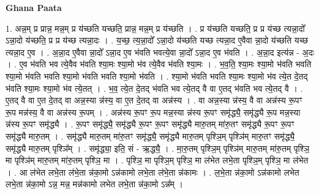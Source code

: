 \documentclass[17pt]{extarticle}
\begin{document}
\textbf{Ghana Paata } \newline

1. अन्न॒म् प्र प्रान्न॒ मन्न॒म् प्र य॑च्छति यच्छति॒ प्रान्न॒ मन्न॒म् प्र य॑च्छति । . प्र य॑च्छति यच्छति॒ प्र प्र य॑च्छ त्यन्ना॒दो᳚ ऽन्ना॒दो य॑च्छति॒ प्र प्र य॑च्छ त्यन्ना॒दः । . य॒च्छ॒ त्य॒न्ना॒दो᳚ ऽन्ना॒दो य॑च्छति यच्छ त्यन्ना॒द ए॒वैवा न्ना॒दो य॑च्छति यच्छ त्यन्ना॒द ए॒व । . अ॒न्ना॒द ए॒वैवा न्ना॒दो᳚ ऽन्ना॒द ए॒व भ॑वति भवत्ये॒वा न्ना॒दो᳚ ऽन्ना॒द ए॒व भ॑वति । . अ॒न्ना॒द इत्य॑न्न - अ॒दः । . ए॒व भ॑वति भव त्ये॒वैव भ॑वति श्या॒मः श्या॒मो भ॑व त्ये॒वैव भ॑वति श्या॒मः । . भ॒व॒ति॒ श्या॒मः श्या॒मो भ॑वति भवति श्या॒मो भ॑वति भवति श्या॒मो भ॑वति भवति श्या॒मो भ॑वति । . श्या॒मो भ॑वति भवति श्या॒मः श्या॒मो भ॑व त्ये॒त दे॒तद् भ॑वति श्या॒मः श्या॒मो भ॑व त्ये॒तत् । . भ॒व॒ त्ये॒त दे॒तद् भ॑वति भव त्ये॒तद् वै वा ए॒तद् भ॑वति भव त्ये॒तद् वै । . ए॒तद् वै वा ए॒त दे॒तद् वा अन्न॒स्या न्न॑स्य॒ वा ए॒त दे॒तद् वा अन्न॑स्य । . वा अन्न॒स्या न्न॑स्य॒ वै वा अन्न॑स्य रू॒पꣳ रू॒प मन्न॑स्य॒ वै वा अन्न॑स्य रू॒पम् । . अन्न॑स्य रू॒पꣳ रू॒प मन्न॒स्या न्न॑स्य रू॒पꣳ समृ॑द्ध्यै॒ समृ॑द्ध्यै रू॒प मन्न॒स्या न्न॑स्य रू॒पꣳ समृ॑द्ध्यै । . रू॒पꣳ समृ॑द्ध्यै॒ समृ॑द्ध्यै रू॒पꣳ रू॒पꣳ समृ॑द्ध्यै मारु॒तम् मा॑रु॒तꣳ समृ॑द्ध्यै रू॒पꣳ रू॒पꣳ समृ॑द्ध्यै मारु॒तम् । . समृ॑द्ध्यै मारु॒तम् मा॑रु॒तꣳ समृ॑द्ध्यै॒ समृ॑द्ध्यै मारु॒तम् पृश्ञि॒म् पृश्ञि॑म् मारु॒तꣳ समृ॑द्ध्यै॒ समृ॑द्ध्यै मारु॒तम् पृश्ञि᳚म् । . समृ॑द्ध्या॒ इति॒ सं - ऋ॒द्ध्यै॒ । . मा॒रु॒तम् पृश्ञि॒म् पृश्ञि॑म् मारु॒तम् मा॑रु॒तम् पृश्ञि॒ मा पृश्ञि॑म् मारु॒तम् मा॑रु॒तम् पृश्ञि॒ मा । . पृश्ञि॒ मा पृश्ञि॒म् पृश्ञि॒ मा ल॑भेत लभे॒ता पृश्ञि॒म् पृश्ञि॒ मा ल॑भेत । . आ ल॑भेत लभे॒ता ल॑भे॒ता न्न॑का॒मो ऽन्न॑कामो लभे॒ता ल॑भे॒ता न्न॑कामः । . ल॒भे॒ता न्न॑का॒मो ऽन्न॑कामो लभेत लभे॒ता न्न॑का॒मो ऽन्न॒ मन्न॒ मन्न॑कामो लभेत लभे॒ता न्न॑का॒मो ऽन्न᳚म् । \newline
\end{document}
